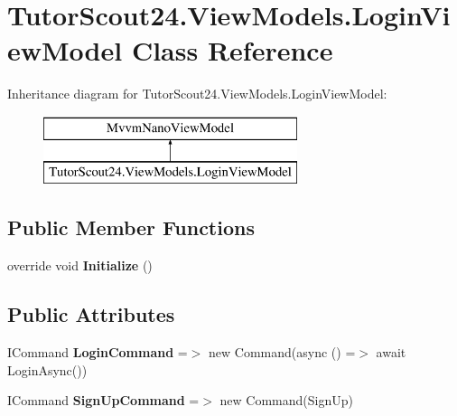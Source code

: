 \hypertarget{class_tutor_scout24_1_1_view_models_1_1_login_view_model}{}\section{Tutor\+Scout24.\+View\+Models.\+Login\+View\+Model Class Reference}
\label{class_tutor_scout24_1_1_view_models_1_1_login_view_model}
Inheritance diagram for Tutor\+Scout24.\+View\+Models.\+Login\+View\+Model\+:\begin{figure}[H]
\begin{center}
\leavevmode
\includegraphics[height=2.000000cm]{class_tutor_scout24_1_1_view_models_1_1_login_view_model}
\end{center}
\end{figure}
\subsection*{Public Member Functions}
\begin{DoxyCompactItemize}
\item 
\mbox{\label{class_tutor_scout24_1_1_view_models_1_1_login_view_model_a3e84459e33d3b42a59a258ec2128040b}} 
override void {\bfseries Initialize} ()
\end{DoxyCompactItemize}
\subsection*{Public Attributes}
\begin{DoxyCompactItemize}
\item 
\mbox{\label{class_tutor_scout24_1_1_view_models_1_1_login_view_model_a8427ccc733e26910a920e4c48da58144}} 
I\+Command {\bfseries Login\+Command} =$>$ new Command(async () =$>$ await Login\+Async())
\item 
\mbox{\label{class_tutor_scout24_1_1_view_models_1_1_login_view_model_af71fff1f208ee9d1a446478cbaf1a2f0}} 
I\+Command {\bfseries Sign\+Up\+Command} =$>$ new Command(Sign\+Up)
\end{DoxyCompactItemize}

